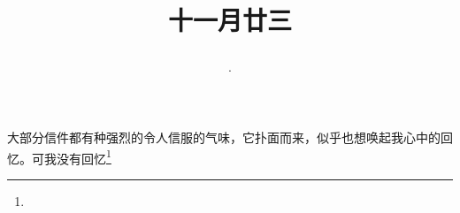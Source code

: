 \title{\date[d=23,m=12,y=2024][year:cn-y,年,month:cn,day:cn,日,·,weekday]·十一月廿三 }
大部分信件都有种强烈的令人信服的气味，它扑面而来，似乎也想唤起我心中的回忆。可我没有回忆\footnote{ }

